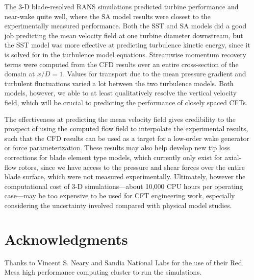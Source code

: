 The 3-D blade-resolved RANS simulations predicted turbine performance and
near-wake quite well, where the SA model results were closest to the
experimentally measured performance. Both the SST and SA models did a good job
predicting the mean velocity field at one turbine diameter downstream, but the
SST model was more effective at predicting turbulence kinetic energy, since it
is solved for in the turbulence model equations. Streamwise momentum recovery
terms were computed from the CFD results over an entire cross-section of the
domain at $x/D=1$. Values for transport due to the mean pressure gradient and
turbulent fluctuations varied a lot between the two turbulence models. Both
models, however, we able to at least qualitatively resolve the vertical velocity
field, which will be crucial to predicting the performance of closely spaced
CFTs.

The effectiveness at predicting the mean velocity field gives credibility to the
prospect of using the computed flow field to interpolate the experimental
results, such that the CFD results can be used as a target for a low-order wake
generator or force parameterization. These results may also help develop new tip
loss corrections for blade element type models, which currently only exist for
axial-flow rotors, since we have access to the pressure and shear forces over
the entire blade surface, which were not measured experimentally. Ultimately,
however the computational cost of 3-D simulations---about 10,000 CPU hours per
operating case---may be too expensive to be used for CFT engineering work,
especially considering the uncertainty involved compared with physical model
studies.


\section{Acknowledgments}

Thanks to Vincent S. Neary and Sandia National Labs for the use of their Red
Mesa high performance computing cluster to run the simulations.

